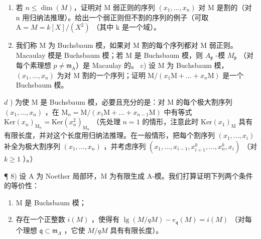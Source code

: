 \begin{enumerate}
\def\labelenumi{\alph{enumi})}
\item
  若 \(n \leqslant \dim(M)\)，证明对 M 弱正则的序列 \((x_{1}, \ldots, x_{n})\) 对 M 是割的（对 n 用归纳法推理）。给出一个弱正则但不割的序列的例子（可取 \(\mathrm{A} = M = k[X]/(X^{2})\) （其中 k 是一个域）。
\item
  我们称 M 为 Buchsbaum 模，如果对 M 割的每个序列都对 M 弱正则。Macaulay 模是 Buchsbaum 模；若 M 是 Buchsbaum 模，则 \(A_{\mathfrak{p}}\) -模 \(M_{\mathfrak{p}}\) （对每个素理想 \(p \neq \mathfrak{m}_{\mathrm{A}}\)）是 Macaulay 的。 c) 设 M 为 Buchsbaum 模，\((x_{1}, \ldots, x_{n})\) 为对 M 割的一个序列；证明 \(\mathrm{M}/(x_{1}\mathrm{M} + \ldots + x_{n}\mathrm{M})\) 是一个 Buchsbaum 模。
\end{enumerate}

\(d\) ) 为使 M 是 Buchsbaum 模，必要且充分的是：对 M 的每个极大割序列 \((x_{1},\ldots ,x_{n})\) ，在 \(\mathrm{M}_n = \mathrm{M} / (x_1\mathrm{M} + \dots +x_{n - 1}\mathrm{M})\) 中有等式 \(\mathrm{Ker}(x_n)_{\mathrm{M}_n} = \mathrm{Ker}(x_n^2)_{\mathrm{M}_n}\) （先处理 \(n = 1\) 的情形，注意此时 \(\mathrm{Ker}(x_1)_{\mathrm{M}}\) 具有有限长度，并对这个长度用归纳法推理。在一般情形，把每个割序列 \((x_{1},\ldots ,x_{i})\) 补全为极大割序列 \((x_{1},\ldots ,x_{n})\) ，并考虑序列 \((x_{1},\ldots ,x_{i - 1},x_{i + 1}^{k},\ldots ,x_{n}^{k},x_{i})\) （对 \(k\geqslant 1\) ）。）

¶ 8) 设 A 为 Noether 局部环，M 为有限生成 A-模。我们打算证明下列两个条件的等价性：

\begin{enumerate}
\def\labelenumi{(\roman{enumi})}
\item
  M 是 Buchsbaum 模；
\item
  存在一个正整数 \(i(M)\) ，使得有 \(\lg(M/qM)-e_{\mathfrak{q}}(M)=i(M)\) （对每个理想 \(\mathfrak{q}\subset\mathfrak{m}_{A}\) ，它使 \(M/qM\) 具有有限长度）。
\end{enumerate}

